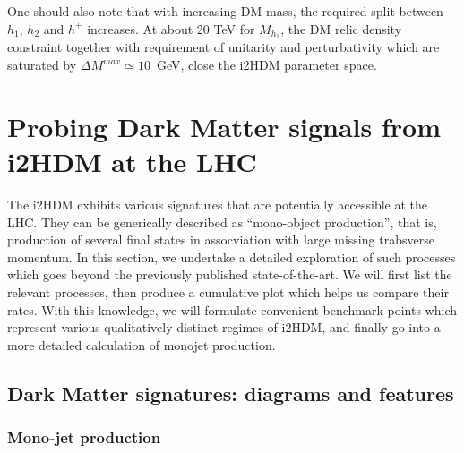 \documentclass[12pt,a4paper]{article}
\newcommand {\blue} {\color{blue}}
\begin{document}
One should also note that with increasing DM mass, the required split between $h_1$, $h_2$ and $h^+$
increases.
At about 20 TeV for $M_{h_1}$, the DM relic density constraint together with 
requirement of unitarity and perturbativity which are saturated by  $\Delta M^{max}\simeq 10$~GeV,
close the i2HDM parameter space.



%
\section{Probing Dark Matter signals from i2HDM at the LHC}

{\blue 
The i2HDM exhibits various signatures that are potentially accessible at the LHC.
They can be generically described as ``mono-object production'', that is,
production of several final states in assocviation with large missing trabsverse momentum.
In this section, we undertake a detailed exploration of such processes which goes 
beyond the previously published state-of-the-art.
We will first list the relevant processes, then produce a cumulative plot which
helps us compare their rates. 
With this knowledge, we will formulate convenient benchmark points which
represent various qualitatively distinct regimes of i2HDM, and finally go into a more detailed
calculation of monojet production.
}

\subsection{Dark Matter signatures: diagrams and features}

\subsubsection{Mono-jet production}
\end{document}

